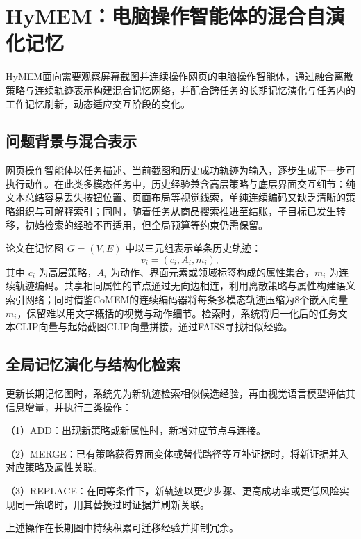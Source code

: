 \section{HyMEM：电脑操作智能体的混合自演化记忆}
\label{sec:hymem}

HyMEM面向需要观察屏幕截图并连续操作网页的电脑操作智能体，通过融合离散策略与连续轨迹表示构建混合记忆网络，并配合跨任务的长期记忆演化与任务内的工作记忆刷新，动态适应交互阶段的变化。

\subsection{问题背景与混合表示}

网页操作智能体以任务描述、当前截图和历史成功轨迹为输入，逐步生成下一步可执行动作。在此类多模态任务中，历史经验兼含高层策略与底层界面交互细节：纯文本总结容易丢失按钮位置、页面布局等视觉线索，单纯连续编码又缺乏清晰的策略组织与可解释索引；同时，随着任务从商品搜索推进至结账，子目标已发生转移，初始检索的经验不再适用，但全局预算等约束仍需保留。

论文在记忆图 $G=(V,E)$ 中以三元组表示单条历史轨迹：
\begin{equation}
v_i=(c_i,A_i,m_i),
\end{equation}
其中 $c_i$ 为高层策略，$A_i$ 为动作、界面元素或领域标签构成的属性集合，$m_i$ 为连续轨迹编码。共享相同属性的节点通过无向边相连，利用离散策略与属性构建语义索引网络；同时借鉴CoMEM的连续编码器将每条多模态轨迹压缩为8个嵌入向量 $m_i$，保留难以用文字概括的视觉与动作细节。检索时，系统将归一化后的任务文本CLIP向量与起始截图CLIP向量拼接，通过FAISS寻找相似经验。

\noindent\begin{minipage}{\linewidth}
\setlength{\parindent}{2em}
\subsection{全局记忆演化与结构化检索}

更新长期记忆图时，系统先为新轨迹检索相似候选经验，再由视觉语言模型评估其信息增量，并执行三类操作：

（1）ADD：出现新策略或新属性时，新增对应节点与连接。

（2）MERGE：已有策略获得界面变体或替代路径等互补证据时，将新证据并入对应策略及属性关联。

（3）REPLACE：在同等条件下，新轨迹以更少步骤、更高成功率或更低风险实现同一策略时，用其替换过时证据并刷新关联。

上述操作在长期图中持续积累可迁移经验并抑制冗余。

\end{minipage}\par

